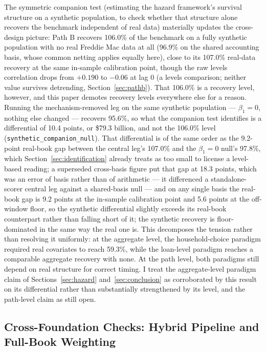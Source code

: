 \documentclass[12pt]{article}
\begin{document}
The symmetric companion test (estimating the hazard framework's survival structure on a synthetic population, to check whether that structure alone recovers the benchmark independent of real data) materially updates the cross-design picture: Path B recovers 106.0\% of the benchmark on a fully synthetic population with no real Freddie Mac data at all (96.9\% on the shared accounting basis, whose common netting applies equally here), close to its 107.0\% real-data recovery at the same in-sample calibration point, though the raw levels correlation drops from $+0.190$ to $-0.06$ at lag 0 (a levels comparison; neither value survives detrending, Section~\ref{sec:pathb}). That 106.0\% is a recovery level, however, and this paper demotes recovery levels everywhere else for a reason. Running the mechanism-removed leg on the same synthetic population --- $\beta_1 = 0$, nothing else changed --- recovers 95.6\%, so what the companion test identifies is a differential of 10.4 points, or \$79.3 billion, and not the 106.0\% level (\texttt{synthetic\_companion\_null}). That differential is of the same order as the 9.2-point real-book gap between the central leg's 107.0\% and the $\beta_1 = 0$ null's 97.8\%, which Section~\ref{sec:identification} already treats as too small to license a level-based reading; a superseded cross-basis figure put that gap at 18.3 points, which was an error of basis rather than of arithmetic --- it differenced a standalone-scorer central leg against a shared-basis null --- and on any single basis the real-book gap is 9.2 points at the in-sample calibration point and 5.6 points at the off-window floor, so the synthetic differential slightly exceeds its real-book counterpart rather than falling short of it; the synthetic recovery is floor-dominated in the same way the real one is. This decomposes the tension rather than resolving it uniformly: at the aggregate level, the household-choice paradigm required real covariates to reach 59.3\%, while the loan-level paradigm reaches a comparable aggregate recovery with none. At the path level, both paradigms still depend on real structure for correct timing. I treat the aggregate-level paradigm claim of Sections~\ref{sec:hazard} and~\ref{sec:conclusion} as corroborated by this result on its differential rather than substantially strengthened by its level, and the path-level claim as still open.

\subsection{Cross-Foundation Checks: Hybrid Pipeline and Full-Book Weighting}\label{sec:robustness-hybrid}
\end{document}
